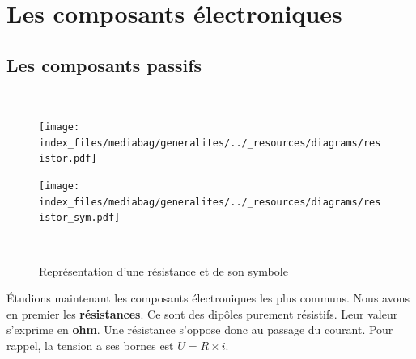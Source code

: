 \documentclass[
  letterpaper,
  DIV=11,
  numbers=noendperiod]{scrreprt}
\begin{document}
\hypertarget{les-composants-uxe9lectroniques}{%
\section{Les composants
électroniques}\label{les-composants-uxe9lectroniques}}

\hypertarget{les-composants-passifs}{%
\subsection{Les composants passifs}\label{les-composants-passifs}}

\begin{figure}

\begin{minipage}[b]{0.10\linewidth}

{\centering 

~

}

\end{minipage}%
%
\begin{minipage}[b]{0.40\linewidth}

{\centering 

\texttt{[image: index\_files/mediabag/generalites/../\_resources/diagrams/resistor.pdf]}

}

\end{minipage}%
%
\begin{minipage}[b]{0.40\linewidth}

{\centering 

\texttt{[image: index\_files/mediabag/generalites/../\_resources/diagrams/resistor\_sym.pdf]}

}

\end{minipage}%
%
\begin{minipage}[b]{0.10\linewidth}

{\centering 

~

}

\end{minipage}%

\caption{\label{fig-resistances}Représentation d'une résistance et de
son symbole}

\end{figure}

Étudions maintenant les composants électroniques les plus communs. Nous
avons en premier les \textbf{résistances}. Ce sont des dipôles purement
résistifs. Leur valeur s'exprime en \textbf{ohm}. Une résistance
s'oppose donc au passage du courant. Pour rappel, la tension a ses
bornes est \(U = R \times i\).
\end{document}
